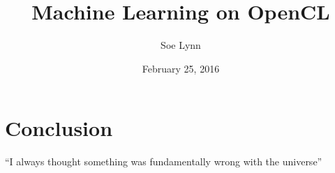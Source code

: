 \documentclass[12pt]{report}
\title{Machine Learning on OpenCL}
\author{Soe Lynn}
\date{February 25, 2016}
\begin{document}
\maketitle

\newpage



\newpage



\newpage

\tableofcontents

\newpage



\section{Conclusion}
``I always thought something was fundamentally wrong with the universe'' \citep{adams1995hitchhiker}



\end{document}
